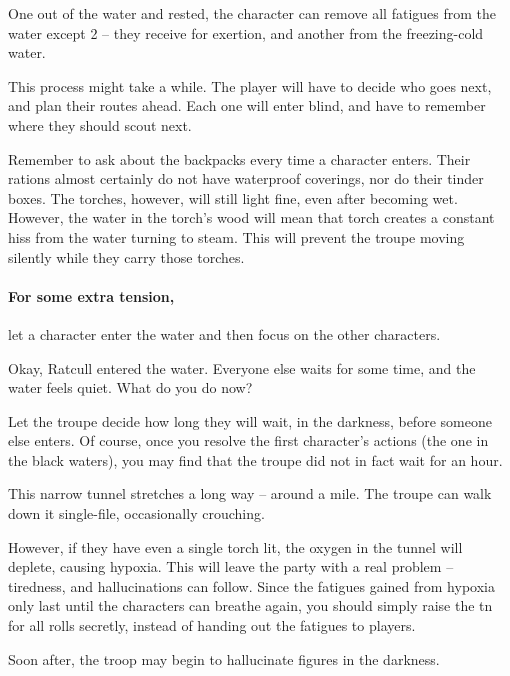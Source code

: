 \begin{multicols}{2}
One out of the water and rested, the character can remove all \glspl{fatigue} from the water except 2 -- they receive  for exertion, and another from the freezing-cold water.

This process might take a while.
The player will have to decide who goes next, and plan their routes ahead.
Each one will enter blind, and have to remember where they should scout next.

Remember to ask about the backpacks every time a character enters.
Their rations almost certainly do not have waterproof coverings, nor do their tinder boxes.
The torches, however, will still light fine, even after becoming wet.
However, the water in the torch's wood will mean that torch creates a constant hiss from the water turning to steam.
This will prevent the troupe moving silently while they carry those torches.

\paragraph{For some extra tension,}
let a character enter the water and then focus on the other characters.

\begin{speechtext}
  Okay, Ratcull entered the water.
  Everyone else waits for some time, and the water feels quiet.
  What do you do now?
\end{speechtext}

Let the troupe decide how long they will wait, in the darkness, before someone else enters.
Of course, once you resolve the first character's actions (the one in the black waters), you may find that the troupe did not in fact wait for an hour.


This narrow tunnel stretches a long way -- around a mile.
The troupe can walk down it single-file, occasionally crouching.

However, if they have even a single torch lit, the oxygen in the tunnel will deplete, causing hypoxia.%
This will leave the party with a real problem -- tiredness, and hallucinations can follow.
Since the \glspl{fatigue} gained from hypoxia only last until the characters can breathe again, you should simply raise the \gls{tn} for all rolls secretly, instead of handing out the \glspl{fatigue} to players.

Soon after, the troop may begin to hallucinate figures in the darkness.


\end{multicols}
